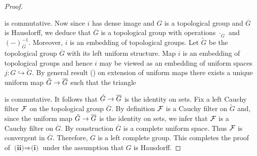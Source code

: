 \documentclass[10pt]{amsart}
\begin{document}
\begin{proof}
\begin{center}
	\end{center}
	is commutative. Now since $i$ has dense image and $G$ is a topological group and $\overline{G}$ is Hausdorff, we deduce that $\overline{G}$ is a topological group with operations $\cdot_{\overline{G}}$ and $(-)^{-1}_{\overline{G}}$. Moreover, $i$ is an embedding of topological groups. Let $\tilde{G}$ be the topological group $\overline{G}$ with its left uniform structure. Map $i$ is an embedding of topological groups and hence $i$ may be viewed as an embedding of uniform spaces $j:G\hookrightarrow \tilde{G}$. By general result (\cite{Uniform_Spaces}) on extension of uniform maps there exists a unique uniform map $\tilde{G}\rightarrow \overline{G}$ such that the triangle
	\begin{center}
	\end{center}
	is commutative. It follows that $\tilde{G}\rightarrow \overline{G}$ is the identity on sets. Fix a left Cauchy filter ${\mathcal F}$ on the topological group $\overline{G}$. By definition ${\mathcal F}$ is a Cauchy filter on $\tilde{G}$ and, since the uniform map $\tilde{G}\rightarrow \overline{G}$ is the identity on sets, we infer that ${\mathcal F}$ is a Cauchy filter on $\overline{G}$. By construction $\overline{G}$ is a complete uniform space. Thus ${\mathcal F}$ is convergent in $\overline{G}$. Therefore, $\overline{G}$ is a left complete group. This completes the proof of $\textbf{(ii)}\Rightarrow \textbf{(i)}$ under the assumption that $G$ is Hausdorff.
\end{proof}



























\small


\end{document}
